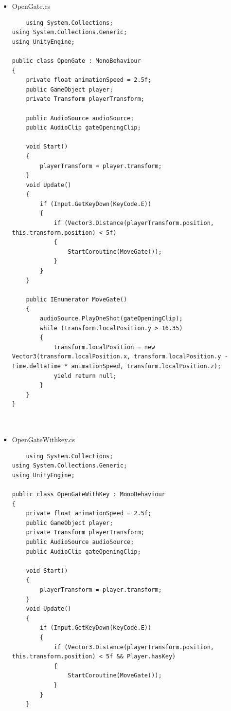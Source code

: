 \documentclass[12pt,a4paper]{article}
\begin{document}
\begin{itemize}
\begin{verbatim}
        }
        //Applying gravity to the controller
        moveDirection.y -= gravity * Time.deltaTime;
        //Making the character move
        controller.Move(moveDirection * Time.deltaTime);
    }
}

	\end{verbatim}
	\item OpenGate.cs
	\begin{verbatim}
	using System.Collections;
using System.Collections.Generic;
using UnityEngine;

public class OpenGate : MonoBehaviour
{
    private float animationSpeed = 2.5f;
    public GameObject player;
    private Transform playerTransform;

    public AudioSource audioSource;
    public AudioClip gateOpeningClip;

    void Start()
    {
        playerTransform = player.transform;
    }
    void Update()
    {
        if (Input.GetKeyDown(KeyCode.E))
        {
            if (Vector3.Distance(playerTransform.position, this.transform.position) < 5f)
            {
                StartCoroutine(MoveGate());
            }
        }
    }

    public IEnumerator MoveGate()
    {
        audioSource.PlayOneShot(gateOpeningClip);
        while (transform.localPosition.y > 16.35)
        {
            transform.localPosition = new Vector3(transform.localPosition.x, transform.localPosition.y - Time.deltaTime * animationSpeed, transform.localPosition.z);
            yield return null;
        }
    }
}



	\end{verbatim}
	\item OpenGateWithkey.cs
	\begin{verbatim}
	using System.Collections;
using System.Collections.Generic;
using UnityEngine;

public class OpenGateWithKey : MonoBehaviour
{
    private float animationSpeed = 2.5f;
    public GameObject player;
    private Transform playerTransform;
    public AudioSource audioSource;
    public AudioClip gateOpeningClip;

    void Start()
    {
        playerTransform = player.transform;
    }
    void Update()
    {
        if (Input.GetKeyDown(KeyCode.E))
        {
            if (Vector3.Distance(playerTransform.position, this.transform.position) < 5f && Player.hasKey)
            {
                StartCoroutine(MoveGate());
            }
        }
    }


\end{verbatim}
\end{itemize}
\end{document}
